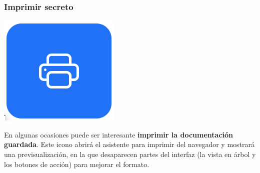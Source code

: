 \documentclass{\ClassPath/viu-tfm-template}
\begin{document}
\subsubsection*{Imprimir secreto}
{
\begin{minipage}{0.1\linewidth}
    \includegraphics[width=\linewidth]{img/print.png}
\end{minipage}
\hspace{0.5cm}
\begin{minipage}{0.9\linewidth}
    En algunas ocasiones puede ser interesante \textbf{imprimir la documentación guardada}. Este icono abrirá el asistente para imprimir del navegador y mostrará una previsualización, en la que desaparecen partes del interfaz (la vista en árbol y los botones de acción) para mejorar el formato.
\end{minipage}
}
\end{document}
